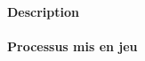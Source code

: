 \paragraph{Description} %
\label{par:buchnera_description}


\cite{dunbar2007}

\paragraph{Processus mis en jeu} %
\label{par:buchnera_process}

